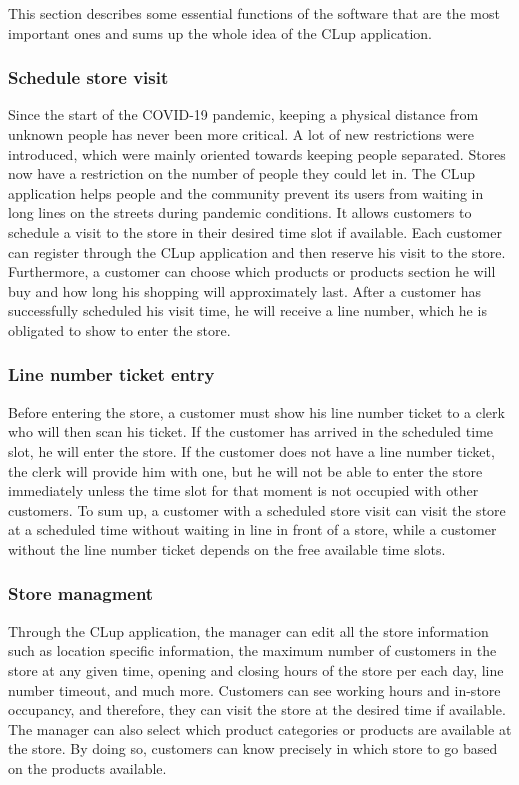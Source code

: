 This section describes some essential functions of the software that are the most important ones and sums up the whole idea of the CLup application.

\subsubsection {Schedule store visit}
Since the start of the COVID-19 pandemic, keeping a physical distance from unknown people has never been more critical.
A lot of new restrictions were introduced, which were mainly oriented towards keeping people separated.
Stores now have a restriction on the number of people they could let in.
The CLup application helps people and the community prevent its users from waiting in long lines on the streets during pandemic conditions.
It allows customers to schedule a visit to the store in their desired time slot if available.
Each customer can register through the CLup application and then reserve his visit to the store.
Furthermore, a customer can choose which products or products section he will buy and how long his shopping will approximately last.
After a customer has successfully scheduled his visit time, he will receive a line number, which he is obligated to show to enter the store.

\subsubsection {Line number ticket entry}
Before entering the store, a customer must show his line number ticket to a clerk who will then scan his ticket.
If the customer has arrived in the scheduled time slot, he will enter the store.
If the customer does not have a line number ticket, the clerk will provide him with one, but he will not be able to enter the store immediately unless the time slot for that moment is not occupied with other customers.
To sum up, a customer with a scheduled store visit can visit the store at a scheduled time without waiting in line in front of a store, while a customer without the line number ticket depends on the free available time slots.

\subsubsection {Store managment}
Through the CLup application, the manager can edit all the store information such as location specific information, the maximum number of customers in the store at any given time, opening and closing hours of the store per each day, line number timeout, and much more.
Customers can see working hours and in-store occupancy, and therefore, they can visit the store at the desired time if available.
The manager can also select which product categories or products are available at the store. By doing so, customers can know precisely in which store to go based on the products available.

